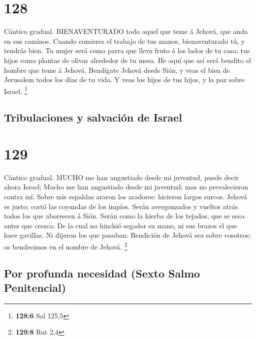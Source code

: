 \hypertarget{section-127}{%
\section{128}\label{section-127}}

 Cántico gradual. BIENAVENTURADO todo aquel que teme á
Jehová, que anda en sus caminos.  Cuando comieres el trabajo
de tus manos, bienaventurado tú, y tendrás bien.  Tu mujer
será como parra que lleva fruto á los lados de tu casa; tus hijos como
plantas de olivas alrededor de tu mesa.  He aquí que así
será bendito el hombre que teme á Jehová.  Bendígate Jehová
desde Sión, y veas el bien de Jerusalem todos los días de tu vida.
 Y veas los hijos de tus hijos, y la paz sobre Israel.
\footnote{\textbf{128:6} Sal 125,5}

\hypertarget{tribulaciones-y-salvaciuxf3n-de-israel}{%
\subsection{Tribulaciones y salvación de
Israel}\label{tribulaciones-y-salvaciuxf3n-de-israel}}

\hypertarget{section-128}{%
\section{129}\label{section-128}}

 Cántico gradual. MUCHO me han angustiado desde mi juventud,
puede decir ahora Israel;  Mucho me han angustiado desde mi
juventud; mas no prevalecieron contra mí.  Sobre mis
espaldas araron los aradores: hicieron largos surcos. 
Jehová es justo; cortó las coyundas de los impíos.  Serán
avergonzados y vueltos atrás todos los que aborrecen á Sión.
 Serán como la hierba de los tejados, que se seca antes que
crezca:  De la cual no hinchió segador su mano, ni sus
brazos el que hace gavillas.  Ni dijeron los que pasaban:
Bendición de Jehová sea sobre vosotros; os bendecimos en el nombre de
Jehová. \footnote{\textbf{129:8} Rut 2,4}

\hypertarget{por-profunda-necesidad-sexto-salmo-penitencial}{%
\subsection{Por profunda necesidad (Sexto Salmo
Penitencial)}\label{por-profunda-necesidad-sexto-salmo-penitencial}}


